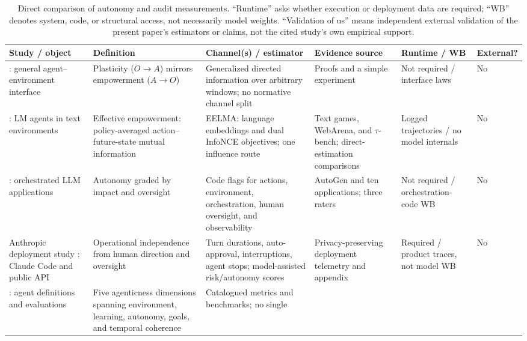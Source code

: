 \begin{table}[htbp]
\centering
\caption{Direct comparison of autonomy and audit measurements. ``Runtime''
asks whether execution or deployment data are required; ``WB'' denotes
system, code, or structural access, not necessarily model weights.
``Validation of us'' means independent external validation of the present
paper's estimators or claims, not the cited study's own empirical support.}
\label{tab:rw-measurement-comparison}
\footnotesize
\setlength{\tabcolsep}{2.5pt}
\renewcommand{\arraystretch}{1.08}
\begin{tabularx}{\textwidth}{@{}
>{\raggedright\arraybackslash}p{}
>{\raggedright\arraybackslash}p{}
>{\raggedright\arraybackslash}X
>{\raggedright\arraybackslash}X
>{\raggedright\arraybackslash}p{}
>{\raggedright\arraybackslash}p{}@{}}
\toprule
Study / object & Definition & Channel(s) / estimator & Evidence source &
Runtime / WB & External? \\
\midrule
\citet{abel2025plasticity}: general agent--environment interface &
Plasticity ($O{\to}A$) mirrors empowerment ($A{\to}O$) &
Generalized directed information over arbitrary windows; no normative
channel split & Proofs and a simple experiment &
Not required / interface laws & No \\
\citet{song2026eelma}: LM agents in text environments &
Effective empowerment: policy-averaged action--future-state mutual information &
EELMA: language embeddings and dual InfoNCE objectives; one influence route &
Text games, WebArena, and $\tau$-bench; direct-estimation comparisons &
Logged trajectories / no model internals & No \\
\citet{cihon2025}: orchestrated LLM applications &
Autonomy graded by impact and oversight &
Code flags for actions, environment, orchestration, human oversight, and
observability & AutoGen and ten applications; three raters &
Not required / orchestration-code WB & No \\
Anthropic deployment study \citep{anthropic2026agents}: Claude Code and
public API & Operational independence from human direction and oversight &
Turn durations, auto-approval, interruptions, agent stops; model-assisted
risk/autonomy scores & Privacy-preserving deployment telemetry and appendix &
Required / product traces, not model WB & No \\
\citet{lassiter2026compendium}: agent definitions and evaluations &
Five agenticness dimensions spanning environment, learning, autonomy, goals,
and temporal coherence & Catalogued metrics and benchmarks; no single

\end{tabularx}
\end{table}
